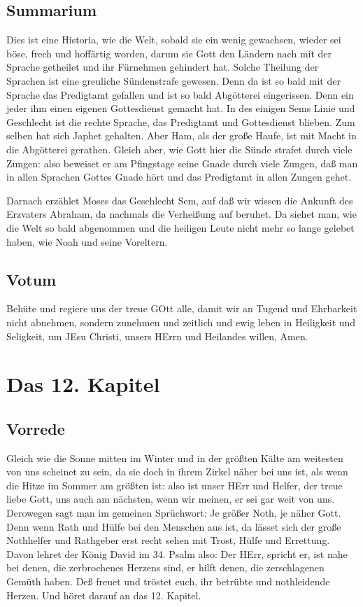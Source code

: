\section{Summarium}

Dies ist eine Historia, wie die Welt, sobald sie ein wenig gewachsen, wieder sei böse, frech und hoffärtig worden, darum sie Gott den Ländern nach mit der Sprache getheilet und ihr Fürnehmen gehindert hat. Solche Theilung der Sprachen ist eine greuliche Sündenstrafe gewesen. Denn da ist so bald mit der Sprache das Predigtamt gefallen und ist so bald Abgötterei eingerissen. Denn ein jeder ihm einen eigenen Gottesdienst gemacht hat. In des einigen Sems Linie und Geschlecht ist die rechte Sprache, das Predigtamt und Gottesdienst blieben. Zum selben hat sich Japhet gehalten. Aber Ham, als der große Haufe, ist mit Macht in die Abgötterei gerathen. Gleich aber, wie Gott hier die Sünde strafet durch viele Zungen: also beweiset er am Pfingstage seine Gnade durch viele Zungen, daß man in allen Sprachen Gottes Gnade hört und das Predigtamt in allen Zungen gehet.

Darnach erzählet Moses das Geschlecht Sem, auf daß wir wissen die Ankunft des Erzvaters
Abraham, da nachmals die Verheißung auf beruhet. Da siehet man, wie die Welt so bald abgenommen und die heiligen Leute nicht mehr so lange gelebet haben, wie Noah und seine Voreltern.

\section{Votum}

Behüte und regiere uns der treue GOtt alle, damit wir an Tugend und Ehrbarkeit nicht abnehmen, sondern zunehmen und zeitlich und ewig leben in Heiligkeit und Seligkeit, um JEsu Christi, unsers HErrn und Heilandes willen, Amen.

\chapter{Das 12. Kapitel}

\section{Vorrede}

Gleich wie die Sonne mitten im Winter und in der größten Kälte am weitesten von uns scheinet zu sein, da sie doch in ihrem Zirkel näher bei uns ist, als wenn die Hitze im Sommer am größten ist: also ist unser HErr und Helfer, der treue liebe Gott, uns auch am nächsten, wenn wir meinen, er sei gar weit von uns. Derowegen sagt man im gemeinen Sprüchwort: Je größer Noth, je näher Gott. Denn wenn Rath und Hülfe bei den Menschen aus ist, da lässet sich der große Nothhelfer und Rathgeber erst recht sehen mit Trost, Hülfe und Errettung. Davon lehret der König David im 34. Psalm also: Der HErr, spricht er, ist nahe bei denen, die zerbrochenes Herzens sind, er hilft denen, die zerschlagenen Gemüth haben. Deß freuet und tröstet euch, ihr betrübte und nothleidende Herzen. Und höret darauf an das 12. Kapitel.

